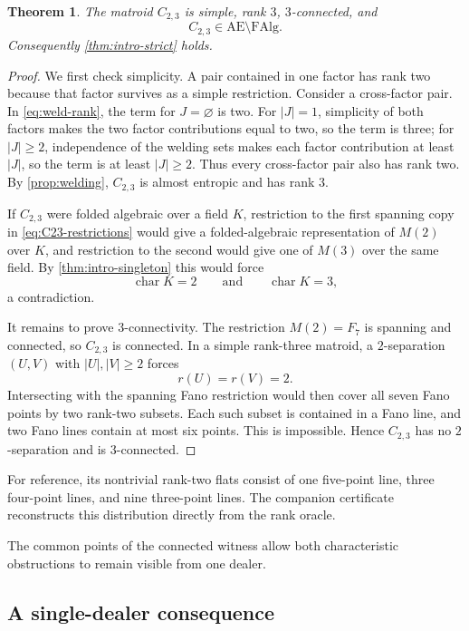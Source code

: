 \documentclass[11pt]{article}
\newtheorem{theorem}{Theorem}[section]
\theoremstyle{definition}
\newcommand{\FAlg}{\mathrm{FAlg}}
\newcommand{\AlmostEnt}{\mathrm{AE}}
\begin{document}
\begin{theorem}\label{thm:C23}
The matroid $C_{2,3}$ is simple, rank $3$, $3$-connected, and
\[
C_{2,3}\in\AlmostEnt\setminus\FAlg.
\]
Consequently \cref{thm:intro-strict} holds.
\end{theorem}
\begin{proof}
We first check simplicity.  A pair contained in one factor has rank two because that factor survives as a simple restriction.  Consider a cross-factor pair.  In \eqref{eq:weld-rank}, the term for $J=\varnothing$ is two.  For $|J|=1$, simplicity of both factors makes the two factor contributions equal to two, so the term is three; for $|J|\ge2$, independence of the welding sets makes each factor contribution at least $|J|$, so the term is at least $|J|\ge2$.  Thus every cross-factor pair also has rank two.  By \cref{prop:welding}, $C_{2,3}$ is almost entropic and has rank $3$.

If $C_{2,3}$ were folded algebraic over a field $K$, restriction to the first spanning copy in \eqref{eq:C23-restrictions} would give a folded-algebraic representation of $M(2)$ over $K$, and restriction to the second would give one of $M(3)$ over the same field.  By \cref{thm:intro-singleton} this would force
\[
\operatorname{char}K=2
\qquad\text{and}\qquad
\operatorname{char}K=3,
\]
a contradiction.

It remains to prove $3$-connectivity.  The restriction $M(2)=F_7$ is spanning and connected, so $C_{2,3}$ is connected.  In a simple rank-three matroid, a $2$-separation $(U,V)$ with $|U|,|V|\ge2$ forces
\[
r(U)=r(V)=2.
\]
Intersecting with the spanning Fano restriction would then cover all seven Fano points by two rank-two subsets.  Each such subset is contained in a Fano line, and two Fano lines contain at most six points.  This is impossible.  Hence $C_{2,3}$ has no $2$-separation and is $3$-connected.
\end{proof}

For reference, its nontrivial rank-two flats consist of one five-point line, three four-point lines, and nine three-point lines.  The companion certificate reconstructs this distribution directly from the rank oracle.

The common points of the connected witness allow both characteristic obstructions to remain visible from one dealer.

\subsection{A single-dealer consequence}\label{subsec:dealer}
\end{document}

